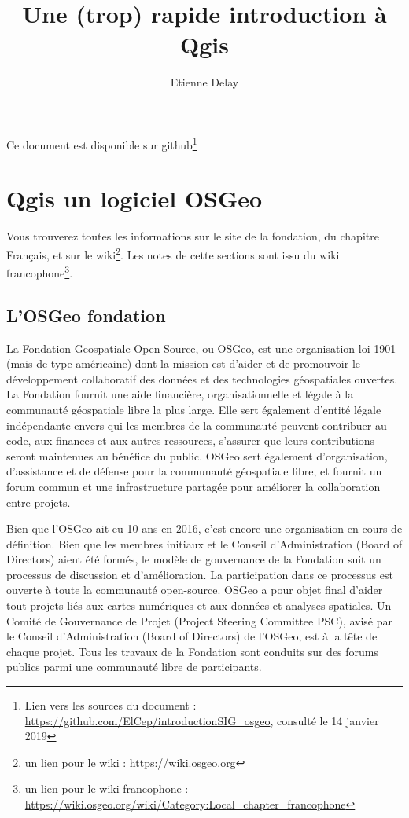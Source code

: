 \documentclass[a4paper, 11pt]{article}
\title{Une (trop) rapide introduction à Qgis}
\author[123]{Etienne Delay}
\affil[1]{1 CIRAD UPR GREEN, F-34398 Montpellier, France}
\affil[2]{GREEN, CIRAD, Univ. Montpellier, Montpellier France}
\affil[3]{Laboratoire GEOLAB UMR 6042 CNRS, Universit\'e de Limoges, FLSH. 39E rue Camille Gu\'erin, 87036 Limoges, France}
\begin{document}
\maketitle
Ce document est disponible sur github\footnote{Lien vers les sources du document : \url{https://github.com/ElCep/introductionSIG_osgeo}, consulté le 14 janvier 2019}

\section{Qgis un logiciel OSGeo}
Vous trouverez toutes les informations sur le site de la fondation, du chapitre Français, et sur le wiki\footnote{un lien pour le wiki : \url{https://wiki.osgeo.org}}. Les notes de cette sections sont issu du wiki francophone\footnote{un lien pour le wiki francophone : \url{https://wiki.osgeo.org/wiki/Category:Local\_chapter\_francophone}}.

  \subsection{L'OSGeo fondation}
  La Fondation Geospatiale Open Source, ou OSGeo, est une organisation loi 1901 (mais de type américaine) dont la mission est d'aider et de promouvoir le développement collaboratif des données et des technologies géospatiales ouvertes. La Fondation fournit une aide financière, organisationnelle et légale à la communauté géospatiale libre la plus large. Elle sert également d'entité légale indépendante envers qui les membres de la communauté peuvent contribuer au code, aux finances et aux autres ressources, s'assurer que leurs contributions seront maintenues au bénéfice du public. OSGeo sert également d'organisation, d'assistance et de défense pour la communauté géospatiale libre, et fournit un forum commun et une infrastructure partagée pour améliorer la collaboration entre projets.

  Bien que l'OSGeo ait eu 10 ans en 2016, c'est encore une organisation en cours de définition. Bien que les membres initiaux et le Conseil d'Administration (Board of Directors) aient été formés, le modèle de gouvernance de la Fondation suit un processus de discussion et d'amélioration. La participation dans ce processus est ouverte à toute la communauté open-source.  OSGeo a pour objet final d'aider tout projets liés aux cartes numériques et aux données et analyses spatiales. Un Comité de Gouvernance de Projet (Project Steering Committee PSC), avisé par le Conseil d'Administration (Board of Directors) de l'OSGeo, est à la tête de chaque projet. Tous les travaux de la Fondation sont conduits sur des forums publics parmi une communauté libre de participants.
\end{document}
